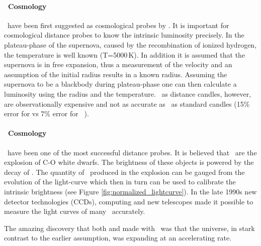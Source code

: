 \paragraph{\snii\ Cosmology}
\sniip\ have been first suggested as cosmological probes by \citet{1974ApJ...193...27K}. It is important for cosmological distance probes to know the intrinsic luminosity precisely. In the plateau-phase of the supernova, caused by the recombination of ionized hydrogen,  the temperature is well known (T=5000\,K). In addition it is assumed that the supernova is in free expansion, thus a measurement of the velocity and an assumption of the initial radius results in a known radius. Assuming the supernova to be a blackbody during plateau-phase one can then calculate a luminosity using the radius and the temperature. \sniip\ as distance candles, however, are observationally expensive and not as accurate as \snia\ as standard candles (15\% error for \snii  vs 7\% error for \snia\ \citep{2006ApJ...645..841N}).

\paragraph{\snia\ Cosmology}
\sneia\ have been one of the most successful distance probes. It is believed that \sneia\ are the explosion of C-O white dwarfs. The brightness of these objects is powered by the decay of \Ni. The quantity of \Ni\ produced in the explosion can be gauged from the evolution of the light-curve which then in turn can be used to calibrate the intrinsic brightness (see Figure \ref{fig:normalized_lightcurve}).
In the late 1990s new detector technologies (CCDs), computing and new telescopes made it possible to measure the light curves of many \sneia\ accurately. 

The amazing discovery that both \citet{1998AJ....116.1009R} and \citet{1999ApJ...517..565P} made with \sneia\ was that the universe, in stark contrast to the earlier assumption, was expanding at an accelerating rate. 

